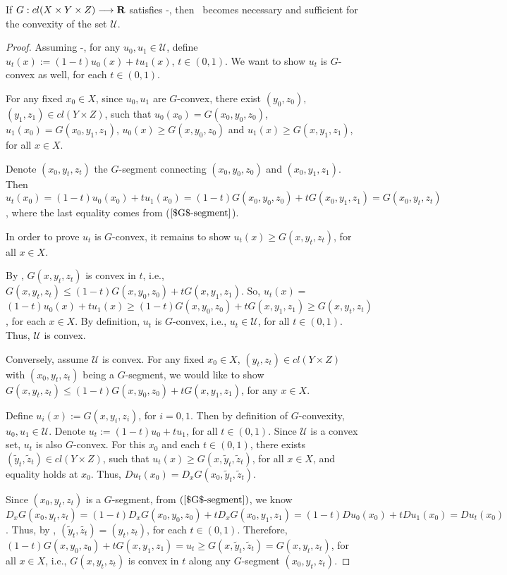\begin{theorem}\label{convex set}
	If $G: cl(X\times Y\times Z) \longrightarrow {\mathbf R}$ satisfies \Gzero-\Gtwo, then \Gthree\ becomes necessary and sufficient for the convexity of the set $\mathcal{U}$.
\end{theorem}
\begin{proof}
	Assuming \Gzero-\Gtwo, for any $u_0, u_1 \in \mathcal{U}$, define $u_t(x) := (1-t)u_0(x)+tu_1(x)$, $t\in (0,1)$. We want to show $u_t$ is $G$-convex as well, for each $t\in (0,1)$. 
	
	For any fixed $x_0 \in X$, since $u_0, u_1$ are $G$-convex, there exist $(y_0,z_0),$ $ (y_1, z_1) \in cl( Y \times Z)$, such that $u_0(x_0)= G(x_0, y_0,z_0)$, $u_1(x_0)=G(x_0,y_1,z_1)$, $u_0(x)\ge G(x,y_0,z_0)$ and $u_1(x)\ge G(x,y_1,z_1)$, for all $ x\in X$. 
	
	Denote $(x_0, y_t, z_t)$ the $G$-segment connecting $(x_0, y_0, z_0)$ and $(x_0, y_1, z_1)$. Then $u_t(x_0) = (1-t)u_0(x_0)+tu_1(x_0)=(1-t) G(x_0, y_0,z_0)+ tG(x_0,y_1,z_1) = G(x_0,y_t, z_t)$, where the last equality comes from ($\ref{$G$-segment}$). 
	
	In order to prove $u_t$ is $G$-convex, it remains to show $u_t(x)\ge  G(x,y_t,z_t)$, for all $x\in X$. 
	
	By \Gthree, $G(x, y_t, z_t)$ is convex in $t$, i.e., $G(x,y_t,z_t)\le (1-t)G(x, y_0,z_0)+tG(x, y_1, z_1)$. So, $u_t(x)=$ $  (1-t)u_0(x)+tu_1(x) \ge (1-t) G(x,y_0,z_0)+tG(x, y_1, z_1)\ge G(x, y_t, z_t)$, for each $x \in X$. By definition, $u_t$ is $G$-convex, i.e., $u_t\in \mathcal{U}$, for all $t \in (0,1)$. Thus, $\mathcal{U}$ is convex.
	
	Conversely, assume $\mathcal{U}$ is convex. For any fixed $x_0 \in X$, $(y_t,z_t) \in cl( Y \times Z)$ with $(x_0, y_t, z_t)$ being a $G$-segment, we would like to show $G(x,y_t, z_t) \le (1-t)G(x,y_0,z_0)+tG(x,y_1, z_1)$, for any $x\in X$.
	

	
	Define $u_i(x) := G(x, y_i, z_i)$, for $i=0,1$. Then by definition of $G$-convexity, $u_0, u_1 \in \mathcal{U}$. Denote $u_t:= (1-t)u_0+tu_1$, for all $t\in (0,1)$. Since $\mathcal{U}$ is a convex set, $u_t$ is also $G$-convex. For this $x_0$ and each $t\in (0,1)$, there exists $(\tilde{y}_t, \tilde{z}_t) \in cl( Y \times Z)$, such that $u_t(x)\ge G(x, \tilde{y}_t, \tilde{z}_t)$, for all $x\in X$, and equality holds at $x_0$. Thus, $Du_t(x_0) = D_x G(x_0, \tilde{y}_t, \tilde{z}_t)$.
	
	Since $(x_0, y_t, z_t)$ is a $G$-segment, from $(\ref{$G$-segment})$, we know $D_x G(x_0, y_t, z_t) = (1-t) D_x G(x_0, y_0, z_0) +t D_x G(x_0, y_1, z_1) = (1-t) Du_0(x_0) +t Du_1(x_0) = Du_t(x_0)$. Thus, by \Gone,  $(\tilde{y}_t , \tilde{z_t}) = (y_t, z_t)$, for each $t\in (0,1)$. Therefore, $(1-t)G(x,y_0,z_0)+tG(x,y_1, z_1) = u_t \ge G(x, \tilde{y}_t, \tilde{z}_t) = G(x, y_t, z_t)$, for all $x\in X$, i.e., $G(x, y_t, z_t)$ is convex in $t$ along any $G$-segment $(x_0, y_t, z_t)$.
\end{proof}



